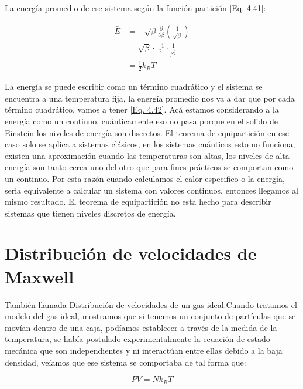 \documentclass[11pt,fleqn]{book}
\begin{document}
La energía promedio de ese sistema según la función partición \ref{Eq. 4.41}:

\begin{equation}
\begin{split}
    \bar{E}&=-\sqrt{\beta}\frac{\partial }{\partial\beta}\left(\frac{1}{\sqrt{\beta}}\right)\\
    &=\sqrt{\beta}\cdot\frac{-1}{2}\cdot\frac{1}{\beta^{\frac{3}{2}}}\\
    &=\frac{1}{2}k_{B}T
    \end{split}
    \label{Eq. 4.42}
\end{equation}

La energía se puede escribir como un término cuadrático y el sistema se encuentra a una temperatura fija, la energía promedio nos va a dar que por cada término cuadrático, vamos a tener \ref{Eq. 4.42}. Acá estamos considerando a la energía como un continuo, cuánticamente eso no pasa porque en el solido de Einstein los niveles de energía son discretos. El teorema de equipartición en ese caso solo se aplica a sistemas clásicos, en los sistemas cuánticos esto no funciona, existen una aproximación cuando las temperaturas son altas, los niveles de alta energía son tanto cerca uno del otro que para fines prácticos se comportan como un continuo. Por esta razón cuando calculamos el calor especifico o la energía, seria equivalente a calcular un sistema con valores continuos, entonces llegamos al mismo resultado. El teorema de equipartición no esta hecho para describir sistemas que tienen niveles discretos de energía. 

\section{Distribución de velocidades de Maxwell}

También llamada Distribución de velocidades de un gas ideal.Cuando tratamos el modelo del gas ideal, mostramos que si tenemos un conjunto de partículas que se movían dentro de una caja, podíamos establecer a través de la medida de la temperatura, se había postulado experimentalmente la ecuación de estado mecánica que son independientes y ni interactúan entre ellas debido a la baja densidad, veíamos que ese sistema se comportaba de tal forma que:


\begin{equation*}
    PV=Nk_{B}T
\end{equation*}
\end{document}
